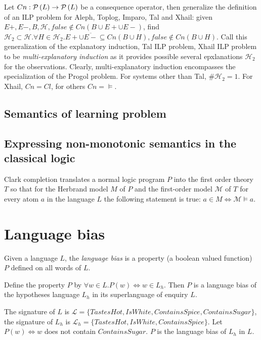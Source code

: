 Let $Cn:\mathcal{P} \left({ L }\right) \to \mathcal{P} \left({ L }\right)$ be a consequence operator, then generalize the definition of an ILP problem for Aleph, Toplog, Imparo, Tal and Xhail:
given $E+, E-, B, \mathcal{H}, false \not\in Cn(B \cup E+ \cup E-)$,
find $\mathcal{H}_2 \subset \mathcal{H}. \forall H \in \mathcal{H}_2. E+ \cup \overline{E-} \subseteq Cn(B \cup H), false \not\in Cn(B \cup H)$. Call this generalization of the explanatory induction, Tal ILP problem, Xhail ILP problem to be \emph{multi-explanatory induction} as it provides possible several epxlanations $\mathcal{H}_2$ for the observations. Clearly, multi-explanatory induction encompasses the specialization of the Progol problem. For systems other than Tal, $\#\mathcal{H}_2=1$. For Xhail, $Cn=Cl$, for others $Cn=\models$.

\subsection{Semantics of learning problem}
\subsection{Expressing non-monotonic semantics in the classical logic}
Clark completion translates a normal logic program $P$ into the first order theory $T$ so that for the Herbrand model $M$ of $P$ and the first-order model $\mathcal{M}$ of $T$ for every atom $a$ in the language $L$ the following statement is true:
$a \in M \iff \mathcal{M} \models a$.

\section{Language bias}
\begin{defn}
Given a language $L$, the \emph{language bias} is a property (a boolean valued function) $P$ defined on all words of $L$.
\end{defn}

\begin{exmp}
Define the property $P$ by $\forall w \in L. P(w) \iff w \in L_h$. Then $P$ is a language bias of the hypotheses language $L_h$ in its superlanguage of enquiry $L$.
\end{exmp}

\begin{exmp}
The signature of $L$ is
$\mathcal{L}=\{TastesHot, IsWhite, ContainsSpice, ContainsSugar\}$,
the signature of $L_h$ is
$\mathcal{L}_h=\{TastesHot, IsWhite, ContainsSpice\}$.
Let $P(w) \iff w$ does not contain $ContainsSugar$. $P$ is the language bias of $L_h$ in $L$.
\end{exmp}

